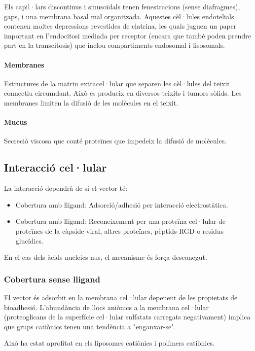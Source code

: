 Els capil·lars discontinus i sinusoïdals tenen fenestracions (sense diafragmes), gaps, i una membrana basal mal organitzada. Aquestes cèl·lules endotelials contenen moltes depressions revestides de clatrina, les quals juguen un paper important en l'endocitosi mediada per receptor (encara que també poden prendre part en la transcitosis) que inclou compartiments endosomal i lisosomals.

\paragraph{Membranes}
Estructures de la matriu extracel·lular que separen les cèl·lules del teixit connectiu circumdant. Això es produeix en diversos teixits i tumors sòlids. Les membranes limiten la difusió de les molècules en el teixit.

\paragraph{Mucus}
Secreció viscosa que conté proteïnes que impedeix la difusió de molècules.

\subsection{Interacció cel·lular}
\label{sec:interaccio-cel.lular}
La interacció dependrà de si el vector té:
\begin{itemize}
\item Cobertura amb lligand: Adsorció/adhesió per interacció electrostàtica.
\item Cobertura amb lligand: Reconeixement per una proteïna cel·lular de proteïnes de la càpside viral, altres proteïnes, pèptids RGD o residus glucídics.
\end{itemize}

En el cas dels àcids nucleics nus, el mecanisme és força desconegut.

\subsubsection{Cobertura sense lligand}
\label{sec:cobert-sense-llig}
El vector és adsorbit en la membrana cel·lular depenent de les propietats de bioadhesió. L'abundància de llocs aniònics a la membrana cel·lular (proteoglicans de la superfície cel·lular sulfatats carregats negativament) implica que grups catiònics tenen una tendència a "enganxar-se".

Això ha estat aprofitat en els liposomes catiònics i polímers catiònics.

